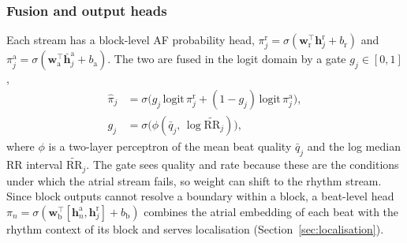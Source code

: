 \documentclass[preprint,12pt]{elsarticle}
\newcommand{\1}{\mathbf{1}}
\begin{document}
\subsubsection{Fusion and output heads}
Each stream has a block-level AF probability head, $\pi^{\mathrm r}_j=\sigma(\bm{w}_{\mathrm r}^{\top}\bm{h}^{\mathrm r}_j+b_{\mathrm r})$ and $\pi^{\mathrm a}_j=\sigma(\bm{w}_{\mathrm a}^{\top}\bar{\bm{h}}^{\mathrm a}_j+b_{\mathrm a})$. The two are fused in the logit domain by a gate $g_j\in[0,1]$,
\begin{equation}
\begin{aligned}
\hat\pi_j&=\sigma\!\bigl(g_j\,\mathrm{logit}\,\pi^{\mathrm r}_j+(1-g_j)\,\mathrm{logit}\,\pi^{\mathrm a}_j\bigr),\\
g_j&=\sigma\bigl(\phi(\bar q_j,\,\log\widetilde{\mathrm{RR}}_j)\bigr),
\end{aligned}
\label{eq:fusion}
\end{equation}
where $\phi$ is a two-layer perceptron of the mean beat quality $\bar q_j$ and the log median RR interval $\widetilde{\mathrm{RR}}_j$. The gate sees quality and rate because these are the conditions under which the atrial stream fails, so weight can shift to the rhythm stream. Since block outputs cannot resolve a boundary within a block, a beat-level head $\pi_n=\sigma(\bm{w}_{\mathrm b}^{\top}[\bm{h}^{\mathrm a}_n,\bm{h}^{\mathrm r}_j]+b_{\mathrm b})$ combines the atrial embedding of each beat with the rhythm context of its block and serves localisation (Section~\ref{sec:localisation}).
\end{document}
